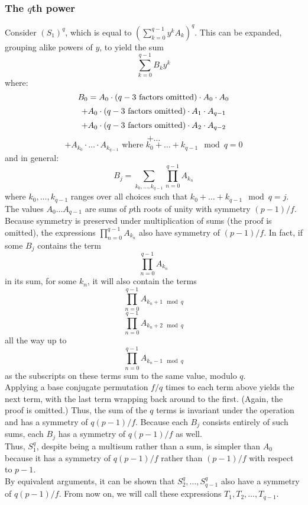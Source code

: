 \documentclass{article}
\begin{document}
\subsubsection{The $ q $th power}
    Consider $ (S_1)^q $, which is equal to $ (\sum_{k = 0}^{q - 1} y^k A_k)^q $. This can be expanded, grouping alike powers of $ y $, to yield the sum
	$$ \sum_{k = 0}^{q - 1} B_k y^k $$
	where:
    $$ B_0 = A_0 \cdot \text{($ q - 3 $ factors omitted)} \cdot A_0 \cdot A_0 $$
    $$ + A_0 \cdot \text{($ q - 3 $ factors omitted)} \cdot A_1 \cdot A_{q - 1} $$
    $$ + A_0 \cdot \text{($ q - 3 $ factors omitted)} \cdot A_2 \cdot A_{q - 2} $$
	$$ + \dots $$
    $$ + A_{k_0} \cdot \dots \cdot A_{k_{q - 1}} \text{ where } k_0 + \dots + k_{q - 1} \mod q = 0 $$
    and in general:
    $$ B_j = \sum_{k_0, \dots, k_{q - 1}} \prod_{n = 0}^{q - 1} A_{k_n} $$
    where $ k_0, \dots, k_{q - 1} $ ranges over all choices such that $ k_0 + \dots + k_{q - 1} \mod q = j $.\\
    The values $ A_0 \dots A_{q - 1} $ are sums of $ p $th roots of unity with symmetry $ (p - 1)/f $. Because symmetry is preserved under multiplication of sums (the proof is omitted), the expressions $ \prod_{n = 0}^{q - 1} A_{k_n} $ also have symmetry of $ (p - 1)/f $. In fact, if some $ B_j $ contains the term
    $$ \prod_{n = 0}^{q - 1} A_{k_n} $$
    in its sum, for some $ k_n $, it will also contain the terms
    $$ \prod_{n = 0}^{q - 1} A_{k_n + 1 \mod q} $$
    $$ \prod_{n = 0}^{q - 1} A_{k_n + 2 \mod q} $$
    all the way up to
    $$ \prod_{n = 0}^{q - 1} A_{k_n - 1 \mod q} $$
    as the subscripts on these terms sum to the same value, modulo $ q $.\\
    Applying a base conjugate permutation $ f/q $ times to each term above yields the next term, with the last term wrapping back around to the first. (Again, the proof is omitted.) Thus, the sum of the $ q $ terms is invariant under the operation and has a symmetry of $ q(p - 1)/f $. Because each $ B_j $ consists entirely of such sums, each $ B_j $ has a symmetry of $ q(p - 1)/f $ as well.\\
    Thus, $ S_1^q $, despite being a multisum rather than a sum, is simpler than $ A_0 $ because it has a symmetry of $ q(p - 1)/f $ rather than $ (p - 1)/f $ with respect to $ p - 1 $.\\
    By equivalent arguments, it can be shown that $ S_2^q, \dots, S_{q - 1}^q $ also have a symmetry of $ q(p - 1)/f $. From now on, we will call these expressions $ T_1, T_2, \dots, T_{q - 1} $.\\
\end{document}
